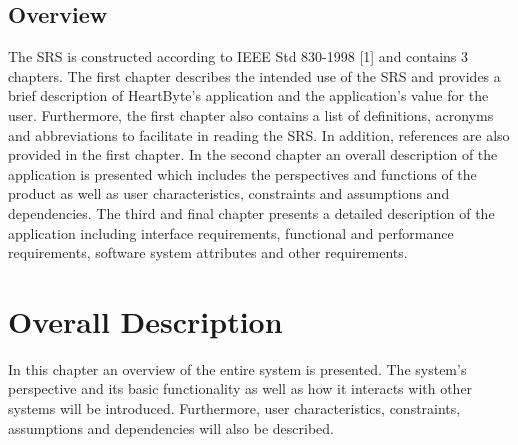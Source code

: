 \documentclass{scrreprt}
\begin{document}
\section{Overview}
The SRS is constructed according to IEEE Std 830-1998 [1] and contains 3 chapters. The first chapter describes the intended use of the SRS and provides a brief description of HeartByte’s application and the application’s value for the user. Furthermore, the first chapter also contains a list of definitions, acronyms and abbreviations to facilitate in reading the SRS. In addition, references are also provided in the first chapter. In the second chapter an overall description of the application is presented which includes the perspectives and functions of the product as well as user characteristics, constraints and assumptions and dependencies. The third and final chapter presents a detailed description of the application including interface requirements, functional and performance requirements, software system attributes and other requirements. 

\chapter{Overall Description}
In this chapter an overview of the entire system is presented. The system's perspective and its basic functionality as well as how it interacts with other systems will be introduced. Furthermore, user characteristics, constraints, assumptions and dependencies will also be described.
\end{document}
